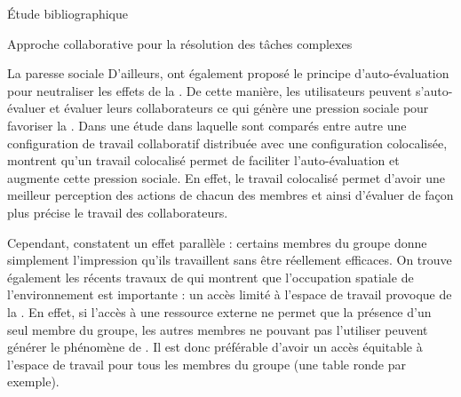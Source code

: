 \documentclass[myfrancais,ngerman,english,french]{mythesis}
\begin{document}
\begin{mychapter}{Étude bibliographique}
\begin{mysection}{Approche collaborative pour la résolution des tâches complexes}
\begin{mysubsection}{La paresse sociale}
				D'ailleurs,  ont également proposé le principe d'auto-évaluation pour neutraliser les effets de la .
				De cette manière, les utilisateurs peuvent s'auto-évaluer et évaluer leurs collaborateurs ce qui génère une pression sociale pour favoriser la  .
				Dans une étude dans laquelle sont comparés entre autre une configuration de travail collaboratif distribuée avec une configuration colocalisée,  montrent qu'un travail colocalisé permet de faciliter l'auto-évaluation et augmente cette pression sociale.
				En effet, le travail colocalisé permet d'avoir une meilleur perception des actions de chacun des membres et ainsi d'évaluer de façon plus précise le travail des collaborateurs.

				Cependant,  constatent un effet parallèle : certains membres du groupe donne simplement l'impression qu'ils travaillent sans être réellement efficaces.
				On trouve également les récents travaux de  qui montrent que l'occupation spatiale de l'environnement est importante : un accès limité à l'espace de travail provoque de la .
				En effet, si l'accès à une ressource externe ne permet que la présence d'un seul membre du groupe, les autres membres ne pouvant pas l'utiliser peuvent générer le phénomène de .
				Il est donc préférable d'avoir un accès équitable à l'espace de travail pour tous les membres du groupe (une table ronde par exemple).


\end{mysubsection}
\end{mysection}
\end{mychapter}
\end{document}
